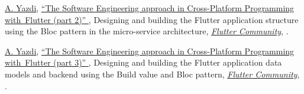 \documentclass[letterpaper,MMMyyyy,nonstopmode]{resume}
\begin{document}
\begin{Body}
\Gap
\NumberedItem{[2]}
\href{https://medium.com/@aliyazdi75}
{\underline{A. Yazdi}},
\href{https://medium.com/flutter-community/the-software-engineering-approach-in-cross-platform-programming-with-flutter-part-2-f7b75056102}
{
``The Software Engineering approach in Cross-Platform Programming  with Flutter (part 2)''
},
\newline Designing and building the Flutter application structure using the Bloc pattern in the micro-service architecture,
\href{https://medium.com/flutter-community}
{\textit{Flutter Community}},
.

\Gap
\NumberedItem{[3]}
\href{https://medium.com/@aliyazdi75}
{\underline{A. Yazdi}},
\href{https://medium.com/flutter-community/the-software-engineering-approach-in-cross-platform-programming-with-flutter-part-3-34c6eff02af0}
{
``The Software Engineering approach in Cross-Platform Programming  with Flutter (part 3)''
},
\newline Designing and building the Flutter application data models and backend using the Build value and Bloc pattern,
\href{https://medium.com/flutter-community}
{\textit{Flutter Community}},
.

\endgroup










\end{Body}
\end{document}
